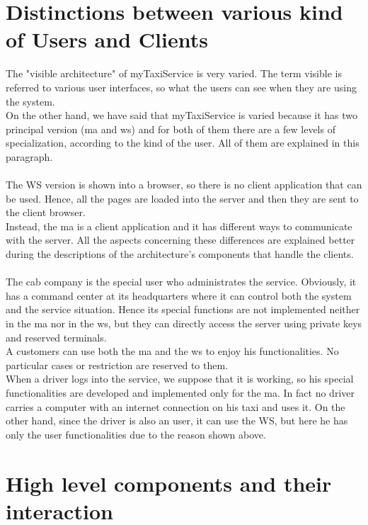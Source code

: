 \documentclass[\mainpath/main]{subfiles}
\begin{document}
\section{Distinctions between various kind of Users and Clients}
\label{ArchitecturalDesign:preamble}
The "visible architecture" of myTaxiService is very varied. The term visible is referred to various user interfaces, so what the users can see when they are using the system.\\
On the other hand, we have said that myTaxiService is varied because it has two principal version (\gls{ma} and \gls{ws}) and for both of them there are a few levels of specialization, according to the kind of the user. All of them are explained in this paragraph.\\
\\
The WS version is shown into a browser, so there is no client application that can be used. Hence, all the pages are loaded into the server and then they are sent to the client browser.\\
Instead, the \gls{ma} is a client application and it has different ways to communicate with the server. All the aspects concerning these differences are explained better during the descriptions of the architecture's components that handle the clients.\\
\\
The cab company is the special user who administrates the service. Obviously, it has a command center at its headquarters where it can control both the system and the service situation. Hence its special functions are not implemented neither in the \gls{ma} nor in the \gls{ws}, but they can directly access the server using private keys and reserved terminals.\\
A customers can use both the \gls{ma} and the \gls{ws} to enjoy his functionalities. No particular cases or restriction are reserved to them.\\
When a driver logs into the service, we suppose that it is working, so his special functionalities are developed and implemented only for the \gls{ma}. In fact no driver carries a computer with an internet connection on his taxi and uses it. On the other hand, since the driver is also an user, it can use the WS, but here he has only the user functionalities due to the reason shown above.\\



\section{High level components and their interaction}
\label{ArchitecturalDesign:high_level}
\end{document}
